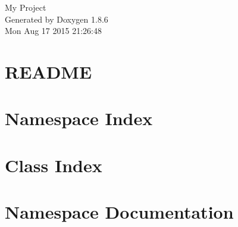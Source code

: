 \documentclass[twoside]{book}
\newcommand{\clearemptydoublepage}{%
  \newpage{\pagestyle{empty}\cleardoublepage}%
}
\begin{document}
\hypersetup{pageanchor=false}
\begin{titlepage}
\vspace*{7cm}
\begin{center}%
{\Large My Project }\\
\vspace*{1cm}
{\large Generated by Doxygen 1.8.6}\\
\vspace*{0.5cm}
{\small Mon Aug 17 2015 21:26:48}\\
\end{center}
\end{titlepage}
\clearemptydoublepage
\tableofcontents
\clearemptydoublepage
{}
\hypersetup{pageanchor=true}

\chapter{R\-E\-A\-D\-M\-E}
\label{md_README}
\hypertarget{md_README}{}

\chapter{Namespace Index}

\chapter{Class Index}

\chapter{Namespace Documentation}

\end{document}
